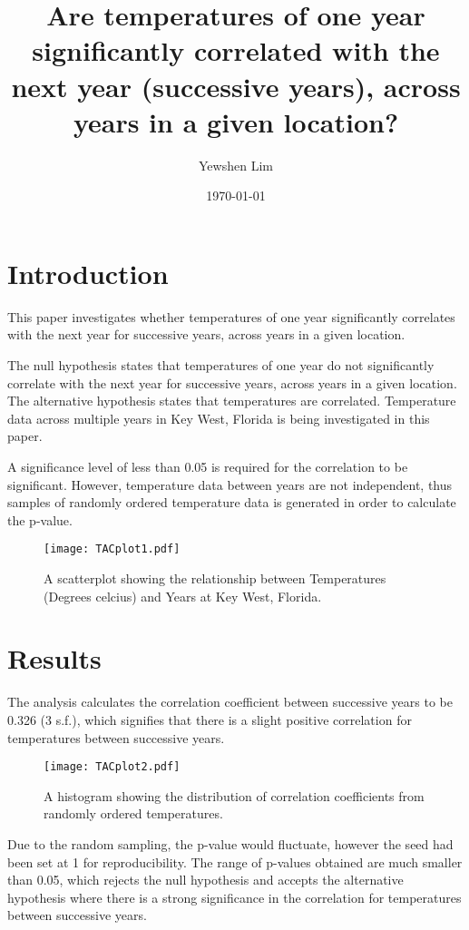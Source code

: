 \documentclass[12pt]{article}
\title{Are temperatures of one year significantly correlated with the next year 
(successive years), across years in a given location?}
\author{Yewshen Lim}
\date{\today}
\begin{document}
\maketitle

\section{Introduction}
This paper investigates whether temperatures of one year significantly
correlates with the next year for successive years, across years in a 
given location.

The null hypothesis states that temperatures of one year do not 
significantly correlate with the next year for successive years, across
years in a given location. The alternative hypothesis states that 
temperatures are correlated. Temperature data across multiple years in 
Key West, Florida is being investigated in this paper.

A significance level of less than 0.05 is required for the correlation to be
significant. However, temperature data between years are not independent, thus 
samples of randomly ordered temperature data is generated in order to calculate
the p-value.

\begin{figure}[hbt!]
\centering
\texttt{[image: TACplot1.pdf]}
\caption{A scatterplot showing the relationship between Temperatures 
(Degrees celcius) and Years at Key West, Florida.}
\label{fig:Fig1}
\end{figure}
    
\newpage
\section{Results}
The analysis calculates the correlation coefficient between successive 
years to be 0.326 (3 s.f.), which signifies that there is a slight 
positive correlation for temperatures between successive years.

\begin{figure}[hbt!]
\centering
\texttt{[image: TACplot2.pdf]}
\caption{A histogram showing the distribution of correlation 
coefficients from randomly ordered temperatures.} 
\label{fig:Fig2}
\end{figure}

\newpage
Due to the random sampling, the p-value would fluctuate, however the 
seed had been set at 1 for reproducibility. The range of p-values 
obtained are much smaller than 0.05, which rejects the null hypothesis 
and accepts the alternative hypothesis where there is a strong 
significance in the correlation for temperatures between successive 
years. 
\end{document}
